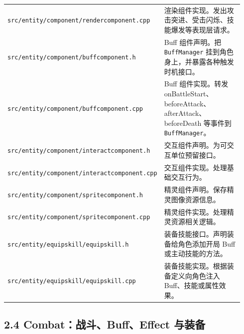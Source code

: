\documentclass[UTF8,10pt]{ctexart}
\begin{document}
{\begin{longtable}{p{0.34\linewidth}p{0.60\linewidth}}
\texttt{src/\allowbreak{}entity/\allowbreak{}component/\allowbreak{}rendercomponent.\allowbreak{}cpp} & 渲染组件实现。发出攻击突进、受击闪烁、技能爆发等表现层请求。 \\
\texttt{src/\allowbreak{}entity/\allowbreak{}component/\allowbreak{}buffcomponent.\allowbreak{}h} & Buff 组件声明。把 \texttt{BuffManager} 挂到角色身上，并暴露各种触发时机接口。 \\
\texttt{src/\allowbreak{}entity/\allowbreak{}component/\allowbreak{}buffcomponent.\allowbreak{}cpp} & Buff 组件实现。转发 onBattleStart、beforeAttack、afterAttack、beforeDeath 等事件到 \texttt{BuffManager}。 \\
\texttt{src/\allowbreak{}entity/\allowbreak{}component/\allowbreak{}interactcomponent.\allowbreak{}h} & 交互组件声明。为可交互单位预留接口。 \\
\texttt{src/\allowbreak{}entity/\allowbreak{}component/\allowbreak{}interactcomponent.\allowbreak{}cpp} & 交互组件实现。处理基础交互行为。 \\
\texttt{src/\allowbreak{}entity/\allowbreak{}component/\allowbreak{}spritecomponent.\allowbreak{}h} & 精灵组件声明。保存精灵图像资源信息。 \\
\texttt{src/\allowbreak{}entity/\allowbreak{}component/\allowbreak{}spritecomponent.\allowbreak{}cpp} & 精灵组件实现。处理精灵资源相关逻辑。 \\
\texttt{src/\allowbreak{}entity/\allowbreak{}equipskill/\allowbreak{}equipskill.\allowbreak{}h} & 装备技能接口。声明装备给角色添加开局 Buff 或主动技能的方法。 \\
\texttt{src/\allowbreak{}entity/\allowbreak{}equipskill/\allowbreak{}equipskill.\allowbreak{}cpp} & 装备技能实现。根据装备定义向角色注入 Buff、技能或属性效果。 \\
\bottomrule
\end{longtable}
}

\subsection*{2.4 Combat：战斗、Buff、Effect 与装备}
\end{document}
